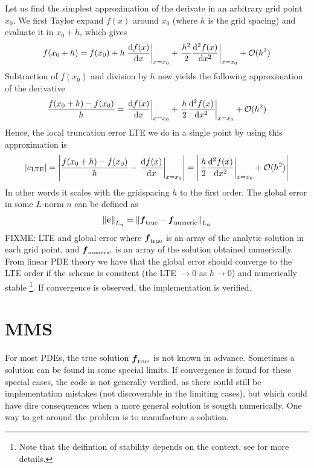 Let us find the simplest approximation of the derivate in an arbitrary grid point $x_0$.
We first Taylor expand $f(x)$ around $x_0$ (where $h$ is the grid spacing) and evaluate it in $x_0 + h$, which gives
%
\begin{align*}
    f(x_0+h)
    = f(x_0)
    + h \left.\frac{\text{d}{f(x)}}{\text{d}{x}}\right|_{x=x_0}
    + \left.\frac{h^2}{2}\frac{\text{d}{^2f(x)}}{\text{d}{x^2}}\right|_{x=x_0}
    + \mathcal{O}(h^3)
\end{align*}
%
Subtraction of $f(x_0)$ and division by $h$ now yields the following approximation of the derivative
%
\begin{align*}
    \frac{f(x_0+h) - f(x_0)}{h}
    =  \left.\frac{\text{d}{f(x)}}{\text{d}{x}}\right|_{x=x_0}
    + \left.\frac{h}{2}\frac{\text{d}{^2f(x)}}{\text{d}{x^2}}\right|_{x=x_0}
    + \mathcal{O}(h^2)
\end{align*}
%
Hence, the local truncation error LTE we do in a single point by using this approximation is
%
\begin{align*}
    |e_{\text{LTE}}|
    =
    \left|\frac{f(x_0+h) - f(x_0)}{h} - \left.\frac{\text{d}{f(x)}}{\text{d}{x}}\right|_{x=x_0}\right|
    =
    \left| \left.\frac{h}{2}\frac{\text{d}{^2f(x)}}{\text{d}{x^2}}\right|_{x=x_0}
    + \mathcal{O}(h^2)\right|
\end{align*}
%
In other words it scales with the gridspacing $h$ to the first order.
The global error in some $L$-norm $n$ can be defined as
%
\begin{align*}
    \left\|\boldsymbol{e}\right\|_{L_n} =
    \left\|\boldsymbol{f}_{\text{true}} - \boldsymbol{f}_{\text{numeric}}\right\|_{L_n}
\end{align*}
%
FIXME: LTE and global error
where $\boldsymbol{f}_{\text{true}}$ is an array of the analytic solution in each grid point, and $\boldsymbol{f}_{\text{numeric}}$ is an array of the solution obtained numerically.
From linear PDE theory we have that the global error should converge to the LTE order if the scheme is consitent (the LTE $\to 0$ as $h\to 0$) and numerically stable%
\footnote{Note that the deifintion of stability depends on the context, see \cite{Leveque2007book} for more details.}.
%
If convergence is observed, the implementation is verified.

\section{MMS}
\label{sec:MMS}
For most PDEs, the true solution $\boldsymbol{f}_{\text{true}}$ is not known in advance.
Sometimes a solution can be found in some special limits.
If convergence is found for these special cases, the code is not generally verified, as there could still be implementation mistakes (not discoverable in the limiting cases), but which could have dire consequences when a more general solution is sougth numerically.
One way to get around the problem is to manufacture a solution.

